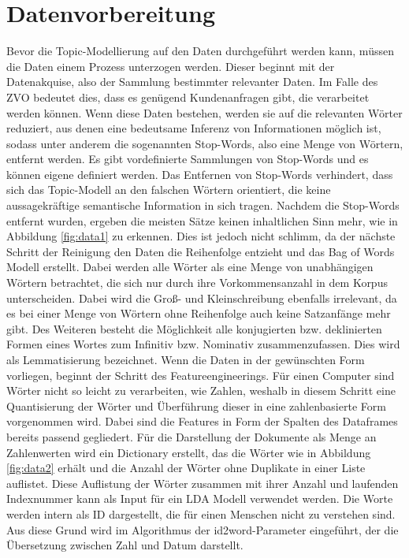 \documentclass[german,version-2020-11]{uzl-thesis}
\begin{document}
\section{Datenvorbereitung}
Bevor die Topic-Modellierung auf den Daten durchgeführt werden kann, müssen die Daten einem Prozess unterzogen werden. Dieser beginnt mit der Datenakquise, also der Sammlung bestimmter relevanter Daten. Im Falle des ZVO bedeutet dies, dass es genügend Kundenanfragen gibt, die verarbeitet werden können. Wenn diese Daten bestehen, werden sie auf die relevanten Wörter reduziert, aus denen eine bedeutsame Inferenz von Informationen möglich ist, sodass unter anderem die sogenannten Stop-Words, also eine Menge von Wörtern, entfernt werden. Es gibt vordefinierte Sammlungen von Stop-Words und es können eigene definiert werden. Das Entfernen von Stop-Words verhindert, dass sich das Topic-Modell an den falschen Wörtern orientiert, die keine aussagekräftige semantische Information in sich tragen. Nachdem die Stop-Words entfernt wurden, ergeben die meisten Sätze keinen inhaltlichen Sinn mehr, wie in Abbildung \ref{fig:data1} zu erkennen. Dies ist jedoch nicht schlimm, da der nächste Schritt der Reinigung den Daten die Reihenfolge entzieht und das Bag of Words Modell erstellt. Dabei werden alle Wörter als eine Menge von unabhängigen Wörtern betrachtet, die sich nur durch ihre Vorkommensanzahl in dem Korpus unterscheiden. Dabei wird die Groß- und Kleinschreibung ebenfalls irrelevant, da es bei einer Menge von Wörtern ohne Reihenfolge auch keine Satzanfänge mehr gibt. Des Weiteren besteht die Möglichkeit alle konjugierten bzw. deklinierten Formen eines Wortes zum Infinitiv bzw. Nominativ zusammenzufassen. Dies wird als Lemmatisierung bezeichnet. Wenn die Daten in der gewünschten Form vorliegen, beginnt der Schritt des Featureengineerings. Für einen Computer sind Wörter nicht so leicht zu verarbeiten, wie Zahlen, weshalb in diesem Schritt eine Quantisierung der Wörter und Überführung dieser in eine zahlenbasierte Form vorgenommen wird. Dabei sind die Features in Form der Spalten des Dataframes bereits passend gegliedert. Für die Darstellung der Dokumente als Menge an Zahlenwerten wird ein Dictionary erstellt, das die Wörter wie in Abbildung \ref{fig:data2} erhält und die Anzahl der Wörter ohne Duplikate in einer Liste auflistet. Diese Auflistung der Wörter zusammen mit ihrer Anzahl und laufenden Indexnummer kann als Input für ein LDA Modell verwendet werden. Die Worte werden intern als ID dargestellt, die für einen Menschen nicht zu verstehen sind. Aus diese Grund wird im Algorithmus der id2word-Parameter eingeführt, der die Übersetzung zwischen Zahl und Datum darstellt. 
\end{document}
